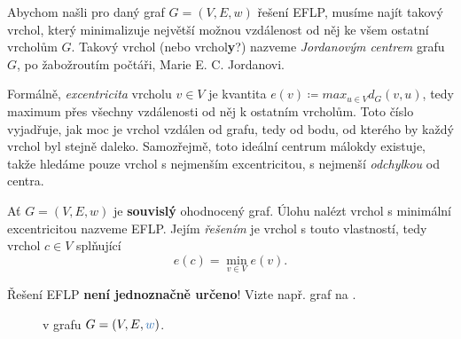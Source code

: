 Abychom našli pro daný graf $G = (V,E,w)$ řešení EFLP, musíme najít takový
vrchol, který minimalizuje největší možnou vzdálenost od něj ke všem ostatní
vrcholům $G$. Takový vrchol (nebo vrchol\textbf{y}?) nazveme \emph{Jordanovým
centrem} grafu $G$, po žabožroutím počtáři, Marie E. C. Jordanovi.

Formálně, \emph{excentricita} vrcholu $v \in V$ je kvantita $e(v) \coloneqq
max_{u \in V} d_G(v,u)$, tedy maximum přes všechny vzdálenosti od něj k
ostatním vrcholům. Toto číslo vyjadřuje, jak moc je vrchol vzdálen od
 grafu, tedy od bodu, od kterého by každý vrchol byl
stejně daleko. Samozřejmě, toto ideální centrum málokdy existuje, takže hledáme
pouze vrchol s nejmenším excentricitou, s nejmenší \emph{odchylkou} od centra.

\begin{definition}
\label{def:eflp}
 Ať $G = (V,E,w)$ je \textbf{souvislý} ohodnocený graf. Úlohu nalézt vrchol s
 minimální excentricitou nazveme EFLP. Jejím \emph{řešením} je vrchol s touto
 vlastností, tedy vrchol $c \in V$ splňující
 \[
  e(c) = \min_{v \in V} e(v).
 \]
\end{definition}

\begin{warning}
 Řešení EFLP \textbf{není jednoznačně určeno}! Vizte např. graf na
 .

 \begin{figure}[H]
 \centering
  \caption{ v grafu $G =
  (V,E,\clb{w})$.}
  \label{fig:minimalni-excentricita}
 \end{figure}
\end{warning}

